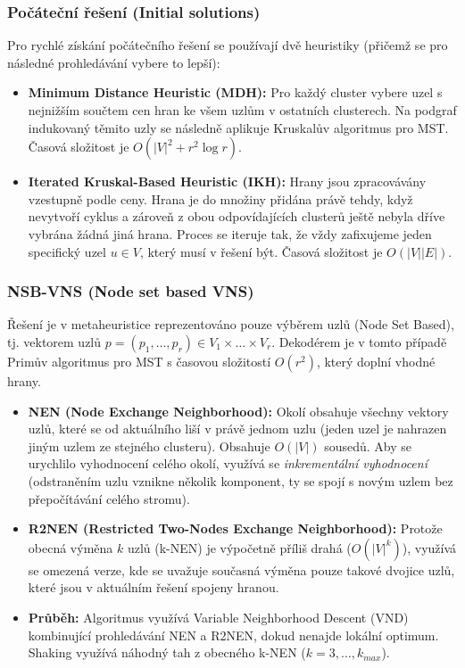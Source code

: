 \documentclass[12pt,a4paper]{article}
\theoremstyle{definition}
\begin{document}
\subsubsection{Počáteční řešení (Initial solutions)}
Pro rychlé získání počátečního řešení se používají dvě heuristiky (přičemž se pro následné prohledávání vybere to lepší):
\begin{itemize}
    \item \textbf{Minimum Distance Heuristic (MDH):} Pro každý cluster vybere uzel s nejnižším součtem cen hran ke všem uzlům v ostatních clusterech. Na podgraf indukovaný těmito uzly se následně aplikuje Kruskalův algoritmus pro MST. Časová složitost je $O(|V|^2 + r^2 \log r)$.
    \item \textbf{Iterated Kruskal-Based Heuristic (IKH):} Hrany jsou zpracovávány vzestupně podle ceny. Hrana je do množiny přidána právě tehdy, když nevytvoří cyklus a zároveň z obou odpovídajících clusterů ještě nebyla dříve vybrána žádná jiná hrana. Proces se iteruje tak, že vždy zafixujeme jeden specifický uzel $u \in V$, který musí v řešení být. Časová složitost je $O(|V||E|)$.
\end{itemize}

\subsubsection{NSB-VNS (Node set based VNS)}
Řešení je v metaheuristice reprezentováno pouze výběrem uzlů (Node Set Based), tj. vektorem uzlů $p = (p_1, \dots, p_r) \in V_1 \times \dots \times V_r$. Dekodérem je v tomto případě Primův algoritmus pro MST s časovou složitostí $O(r^2)$, který doplní vhodné hrany.

\begin{itemize}
    \item \textbf{NEN (Node Exchange Neighborhood):} Okolí obsahuje všechny vektory uzlů, které se od aktuálního liší v právě jednom uzlu (jeden uzel je nahrazen jiným uzlem ze stejného clusteru). Obsahuje $O(|V|)$ sousedů. Aby se urychlilo vyhodnocení celého okolí, využívá se \textit{inkrementální vyhodnocení} (odstraněním uzlu vznikne několik komponent, ty se spojí s novým uzlem bez přepočítávání celého stromu).
    \item \textbf{R2NEN (Restricted Two-Nodes Exchange Neighborhood):} Protože obecná výměna $k$ uzlů (k-NEN) je výpočetně příliš drahá ($O(|V|^k)$), využívá se omezená verze, kde se uvažuje současná výměna pouze takové dvojice uzlů, které jsou v aktuálním řešení spojeny hranou.
    \item \textbf{Průběh:} Algoritmus využívá Variable Neighborhood Descent (VND) kombinující prohledávání NEN a R2NEN, dokud nenajde lokální optimum. Shaking využívá náhodný tah z obecného k-NEN ($k=3, \dots, k_{max}$).
\end{itemize}
\end{document}

